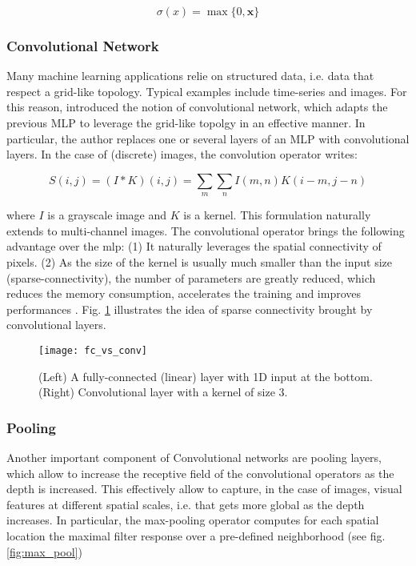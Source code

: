 \begin{equation}
\sigma(x) = \max \{0, \bm{x}\}
\end{equation}

\subsubsection{Convolutional Network}
Many machine learning applications relie on structured data, i.e. data that respect a grid-like topology.
Typical examples include time-series and images.
For this reason, \cite{lecun95} introduced the notion of convolutional network, which adapts the previous MLP to leverage the grid-like topolgy in an effective manner.
In particular, the author replaces one or several layers of an MLP with convolutional layers.
In the case of (discrete) images, the convolution operator writes:

\begin{equation}
S(i,j) = (I * K)(i,j) = \sum_{m} \sum_{n} I(m,n) K(i-m, j-n)
\end{equation}

where $I$ is a grayscale image and $K$ is a kernel.
This formulation naturally extends to multi-channel images.
The convolutional operator brings the following advantage over the \gls{mlp}: (1) It naturally leverages the spatial connectivity of pixels.
(2) As the size of the kernel is usually much smaller than the input size (sparse-connectivity), the number of parameters are greatly reduced, which reduces the memory consumption, accelerates the training and improves performances \cite{lecun95}.
Fig. \ref{fig:cnn_con} illustrates the idea of sparse connectivity brought by convolutional layers.

\begin{figure}[!htpb]
  \texttt{[image: fc\_vs\_conv]}
  \caption{(Left) A fully-connected (linear) layer with 1D input at the bottom. (Right) Convolutional layer with a kernel of size 3.}
  \label{fig:cnn_con}
\end{figure}

\subsubsection{Pooling}

Another important component of Convolutional networks are pooling layers, which allow to increase the receptive field of the convolutional operators as the depth is increased.
This effectively allow to capture, in the case of images, visual features at different spatial scales, i.e. that gets more global as the depth increases.
In particular, the max-pooling operator computes for each spatial location the maximal filter response over a pre-defined neighborhood (see fig. \ref{fig:max_pool})

